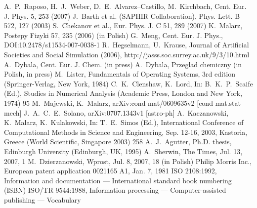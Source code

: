 \documentclass[USenglish,oneside,twocolumn]{article}
\begin{document}
\begin{thebibliography}{99}
 A.~P.~Raposo, H.~J.~Weber, D.~E.~Alvarez--Castillo, M.~Kirchbach, Cent. Eur. J. Phys. 5, 253 (2007)
 J.~Barth et al. (SAPHIR Collaboration), Phys. Lett. B 572, 127 (2003)
 S.~Chekanov et al., Eur. Phys. J. C 51, 289 (2007)
 K.~Malarz, Postepy Fizyki 57, 235 (2006) (in Polish)
 G.~Meng, Cent. Eur. J. Phys., DOI:10.2478/s11534-007-0038-1
 R.~Hegselmann, U.~Krause, Journal of Artificial Societies and Social Simulation (2006), http://jasss.soc.surrey.ac.uk/9/3/10.html
 A.~Dybala, Cent. Eur. J. Chem. (in press)
 A.~Dybala, Przeglad chemiczny (in Polish, in press)
 M.~Lister, Fundamentals of Operating Systems, 3rd edition (Springer-Verlag, New York, 1984)
 C.~K.~Clenshaw, K.~Lord, In: B.~K.~P.~Scaife (Ed.), Studies in Numerical Analysis (Academic Press, London and New York, 1974) 95
 M.~Majewski, K.~Malarz, arXiv:cond-mat/0609635v2 [cond-mat.stat-mech]
 J.~A.~C.~E.~Solano, arXiv:0707.1343v1 [astro-ph]
 A.~Kaczanowski, K.~Malarz, K.~Kulakowski, In: T.~E.~Simos (Ed.), International Conference of Computational Methods in Science and Engineering, Sep. 12-16, 2003, Kastoria, Greece (World Scientific, Singapore 2003) 258
 A.~J.~Agutter, Ph.D. thesis, Edinburgh University (Edinburgh, UK, 1995)
 A.~Sherwin, The Times, Jul. 13, 2007, 1
 M.~Dzierzanowski, Wprost, Jul. 8, 2007, 18 (in Polish)
 Philip Morris Inc., European patent application 0021165 A1, Jan. 7, 1981
 ISO 2108:1992, Information and documentation --- International standard book numbering (ISBN)
 ISO/TR 9544:1988, Information processing --- Computer-assisted publishing --- Vocabulary
\end{thebibliography}
\end{document}
